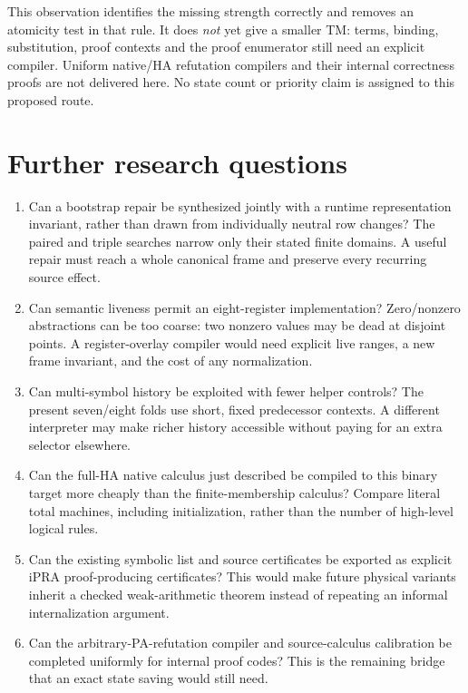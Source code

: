 \documentclass[11pt,letterpaper]{article}
\begin{document}
This observation identifies the missing strength correctly and removes
an atomicity test in that rule. It does \emph{not} yet give a smaller TM:
terms, binding, substitution, proof contexts and the proof enumerator
still need an explicit compiler. Uniform native/HA refutation compilers
and their internal correctness proofs are not delivered here. No state
count or priority claim is assigned to this proposed route.

\section{Further research questions}
\label{sec:future}

\begin{enumerate}
\item Can a bootstrap repair be synthesized jointly with a runtime
representation invariant, rather than drawn from individually neutral
row changes? The paired and triple searches narrow only their stated
finite domains. A useful repair must reach a whole canonical frame and
preserve every recurring source effect.
\item Can semantic liveness permit an eight-register implementation?
Zero/nonzero abstractions can be too coarse: two nonzero values may be
dead at disjoint points. A register-overlay compiler would need explicit
live ranges, a new frame invariant, and the cost of any normalization.
\item Can multi-symbol history be exploited with fewer helper controls?
The present seven/eight folds use short, fixed predecessor contexts.
A different interpreter may make richer history accessible without
paying for an extra selector elsewhere.
\item Can the full-HA native calculus just described be compiled to this
binary target more cheaply than the finite-membership calculus? Compare
literal total machines, including initialization, rather than the number
of high-level logical rules.
\item Can the existing symbolic list and source certificates be exported
as explicit iPRA proof-producing certificates? This would make future
physical variants inherit a checked weak-arithmetic theorem instead of
repeating an informal internalization argument.
\item Can the arbitrary-PA-refutation compiler and source-calculus
calibration be completed uniformly for internal proof codes? This is the
remaining bridge that an exact state saving would still need.
\end{enumerate}
\end{document}
